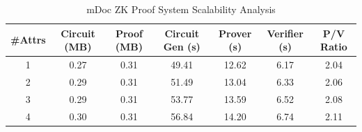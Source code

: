 \begin{table}[h]
\centering
\caption{mDoc ZK Proof System Scalability Analysis}
\label{tab:scalability}
\begin{tabular}{|c|c|c|c|c|c|c|}
\hline
\textbf{\#Attrs} & \textbf{Circuit (MB)} & \textbf{Proof (MB)} & \textbf{Circuit Gen (s)} & \textbf{Prover (s)} & \textbf{Verifier (s)} & \textbf{P/V Ratio} \\
\hline
1 & 0.27 & 0.31 & 49.41 & 12.62 & 6.17 & 2.04 \\
2 & 0.29 & 0.31 & 51.49 & 13.04 & 6.33 & 2.06 \\
3 & 0.29 & 0.31 & 53.77 & 13.59 & 6.52 & 2.08 \\
4 & 0.30 & 0.31 & 56.84 & 14.20 & 6.74 & 2.11 \\
\hline
\end{tabular}
\end{table}